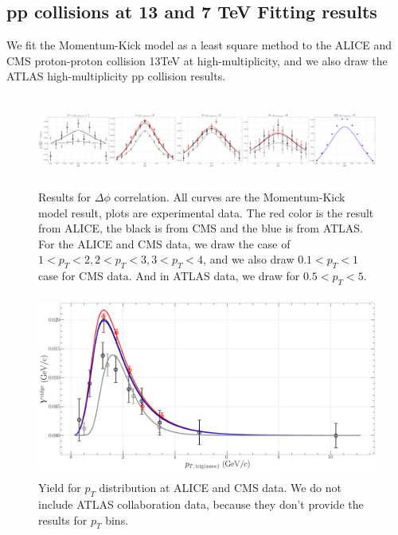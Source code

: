 \documentclass[jkps,fleqn,showpacs,showkeys]{revtex4}
\begin{document}
\subsection{pp collisions at 13 and 7 TeV Fitting results}
\label{subsec: pp collisions Fitting results}

We fit the Momentum-Kick model as a least square method to the ALICE and CMS proton-proton collision 13TeV at high-multiplicity\cite{alice, cms}, and we also draw the ATLAS high-multiplicity pp collision results\cite{atlas}.

\begin{figure}[ht]
\centering
\includegraphics[width=18cm, height=3cm]{./Figures/Paper_phiCorr}
\caption{Results for $\Delta \phi$ correlation. All curves are the Momentum-Kick model result, plots are experimental data.
The red color is the result from ALICE, the black is from CMS and the blue is from ATLAS.
For the ALICE and CMS data, we draw the case of $1<p_T<2, 2<p_T<3, 3<p_T<4$, and we also draw $0.1<p_T<1$ case for CMS data. And in ATLAS data, we draw for $0.5<p_T<5$.}
\label{figure:phicorr}
\end{figure}

\begin{figure}[ht]
\centering
\includegraphics[width=12cm, height=6cm]{./Figures/Paper_pTdis}
\caption{Yield for $p_T$ distribution at ALICE and CMS data. We do not include ATLAS collaboration data, because they don't provide the results for $p_T$ bins.}
\label{figure:pTdis}
\end{figure}
\end{document}
